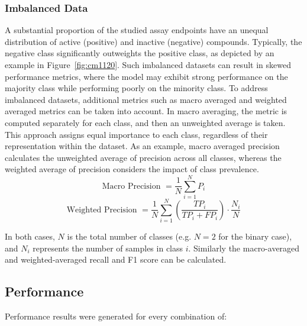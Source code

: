 \subsubsection{Imbalanced Data}
A substantial proportion of the studied assay endpoints have an unequal distribution of active (positive) and inactive (negative) compounds. Typically, the negative class significantly outweights the positive class, as depicted by an example in Figure~\ref{fig:cm1120}. Such imbalanced datasets can result in skewed performance metrics, where the model may exhibit strong performance on the majority class while performing poorly on the minority class. To address imbalanced datasets, additional metrics such as macro averaged and weighted averaged metrics can be taken into account.
In macro averaging, the metric is computed separately for each class, and then an unweighted average is taken. This approach assigns equal importance to each class, regardless of their representation within the dataset. As an example, macro averaged precision calculates the unweighted average of precision across all classes, whereas the weighted average of precision considers the impact of class prevalence.
\[ \text{Macro Precision } = \frac{1}{N} \sum_{i=1}^{N} P_i \] 
\[ \text{Weighted Precision } = \frac{1}{N} \sum_{i=1}^{N} \left(\frac{TP_i}{TP_i + FP_i}\right) \cdot \frac{N_i}{N} \]

In both cases, $N$ is the total number of classes (e.g. $N=2$ for the binary case), and $N_i$ represents the number of samples in class $i$. Similarly the macro-averaged and weighted-averaged recall and F1 score can be calculated.


\subsection{Performance}

Performance results were generated for every combination of:


